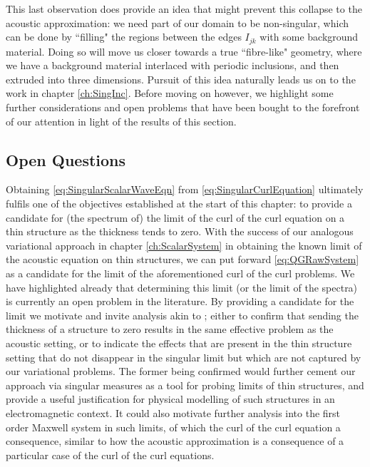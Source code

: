 This last observation does provide an idea that might prevent this collapse to the acoustic approximation:  we need part of our domain to be non-singular, which can be done by ``filling" the regions between the edges $I_{jk}$ with some background material.
Doing so will move us closer towards a true ``fibre-like" geometry, where we have a background material interlaced with periodic inclusions, and then extruded into three dimensions.
Pursuit of this idea naturally leads us on to the work in chapter \ref{ch:SingInc}.
Before moving on however, we highlight some further considerations and open problems that have been bought to the forefront of our attention in light of the results of this section.

\subsection{Open Questions} \label{ssec:CC-OpenQuestions}
Obtaining \eqref{eq:SingularScalarWaveEqn} from \eqref{eq:SingularCurlEquation} ultimately fulfils one of the objectives established at the start of this chapter: to provide a candidate for (the spectrum of) the limit of the curl of the curl equation on a thin structure as the thickness tends to zero.
With the success of our analogous variational approach in chapter \ref{ch:ScalarSystem} in obtaining the known limit of the acoustic equation on thin structures, we can put forward \eqref{eq:QGRawSystem} as a candidate for the limit of the aforementioned curl of the curl problems.
We have highlighted already that determining this limit (or the limit of the spectra) is currently an open problem in the literature.
By providing a candidate for the limit we motivate and invite analysis akin to \cite{kuchment2001convergence, kuchment2003asymptotics, exner2005convergence}; either to confirm that sending the thickness of a structure to zero results in the same effective problem as the acoustic setting, or to indicate the effects that are present in the thin structure setting that do not disappear in the singular limit but which are not captured by our variational problems.
The former being confirmed would further cement our approach via singular measures as a tool for probing limits of thin structures, and provide a useful justification for physical modelling of such structures in an electromagnetic context.
It could also motivate further analysis into the first order Maxwell system in such limits, of which the curl of the curl equation a consequence, similar to how the acoustic approximation is a consequence of a particular case of the curl of the curl equations. 
